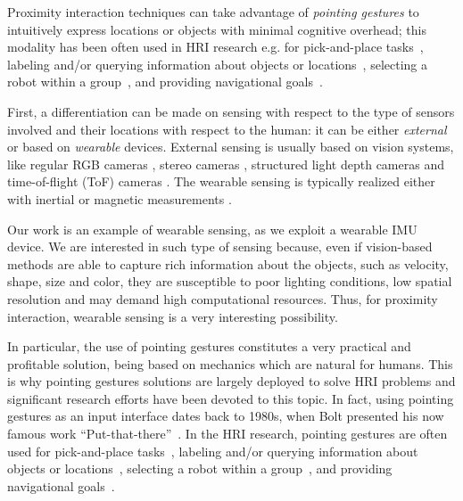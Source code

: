 Proximity interaction techniques can take advantage of \emph{pointing gestures} to intuitively express locations or objects with minimal cognitive overhead; this modality has been often used in HRI research e.g. for pick-and-place tasks~\cite{Brooks2006,Droeschel2011,Grossmann2014,Cosgun2015}, labeling and/or querying information about objects or locations~\cite{Brooks2006,Pateraki2014,Akkil2016}, selecting a robot within a group~\cite{Nagi2014a,Pourmehr2013}, and providing navigational goals~\cite{VanDenBergh2011,Abidi2013,Wolf2013,Jevtic2015,Gromov2016,Tolgyessy2017,gromov2018video}.

First, a differentiation can be made on sensing with respect to the type of sensors involved and their locations with respect to the human: it can be either \emph{external} or based on \emph{wearable} devices.
External sensing is usually based on vision systems, like regular RGB cameras \cite{Pateraki2014,Monajjemi2016}, stereo cameras \cite{Nickel2003}, structured light depth cameras \cite{Cosgun2015} and time-of-flight (ToF) cameras \cite{Droeschel2011}. The wearable sensing is typically realized either with inertial \cite{Wolf2013,Sugiyama2013} or magnetic measurements \cite{Bolt1980,Nickel2003}. 

Our work is an example of wearable sensing, as we exploit a wearable IMU device. We are interested in such type of sensing because, even if vision-based methods are able to capture rich information about the objects, such as velocity, shape, size and color, they are susceptible to poor lighting conditions, low spatial resolution and may demand high computational resources.
Thus, for proximity interaction, wearable sensing is a very interesting possibility.

In particular, the use of pointing gestures constitutes a very practical and profitable solution, being based on mechanics which are natural for humans. This is why pointing gestures solutions are largely deployed to solve HRI problems and significant research efforts have been devoted to this topic.
In fact, using pointing gestures as an input interface dates back to 1980s, when Bolt presented his now famous work ``Put-that-there''~\cite{Bolt1980}.
In the HRI research, pointing gestures are often used for pick-and-place tasks~\cite{Brooks2006,Droeschel2011,Grossmann2014,Cosgun2015}, labeling and/or querying information about objects or locations~\cite{Brooks2006,Pateraki2014,Akkil2016}, selecting a robot within a group~\cite{Nagi2014a,Pourmehr2013}, and providing navigational goals~\cite{VanDenBergh2011,Abidi2013,Wolf2013,Jevtic2015,Gromov2016,Tolgyessy2017}.

